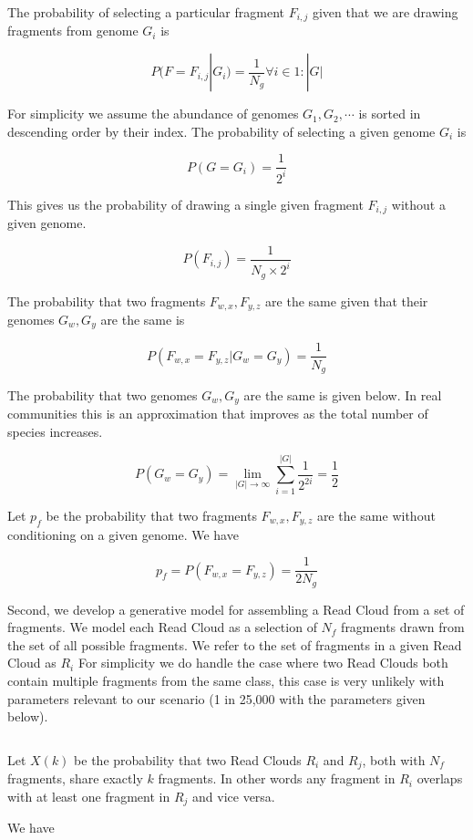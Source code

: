 \[\]

The probability of selecting a particular fragment $F_{i,j}$ given that we are drawing fragments from genome $G_i$ is %

\[ P(F=F_{i,j} | G_i) = \frac{1}{N_g } \forall i \in 1:|G| \]

For simplicity we assume the abundance of genomes $G_1, G_2, \cdots$ is sorted in descending order by their index. The probability of selecting a given genome $G_i$ is

\[ P(G = G_i) = \frac{1}{ 2^i } \]

This gives us the probability of drawing a single given fragment $F_{i,j}$ without a given genome.

\[ P(F_{i,j}) = \frac{1}{N_g \times 2^i} \]

The probability that two fragments $F_{w,x}, F_{y,z}$ are the same given that their genomes $G_w, G_y$ are the same is

\[ P( F_{w,x} = F_{y,z} | G_w = G_y) = \frac{1}{N_g} \]

The probability that two genomes $G_w, G_y$ are the same is given below. In real communities this is an approximation that improves as the total number of species increases.

\[ P(G_w = G_y) = \lim_{|G| \rightarrow \infty} \sum_{i=1}^{|G|} \frac{1}{2^{2i}} = \frac{1}{2}\]

Let $p_f$ be the probability that two fragments $F_{w,x}, F_{y,z}$ are the same without conditioning on a given genome. We have

\[ p_f = P( F_{w,x} = F_{y,z}) = \frac{1}{2N_g }  \]

Second, we develop a generative model for assembling a Read Cloud from a set of fragments. We model each Read Cloud as a selection of $N_f$ fragments drawn from the set of all possible fragments. We refer to the set of fragments in a given Read Cloud as $R_i$ For simplicity we do handle the case where two Read Clouds both contain multiple fragments from the same class, this case is very unlikely with parameters relevant to our scenario (1 in 25,000 with the parameters given below). 

\[\]

Let $X(k)$ be the probability that two Read Clouds $R_i$ and $R_j$, both with $N_f$ fragments, share exactly $k$ fragments. In other words any fragment in $R_i$ overlaps with at least one fragment in $R_j$ and vice versa. 


We have 

